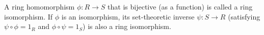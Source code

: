A ring homomorphism $\phi: R \to S$ that is bijective (as a function) is called a ring isomorphism. If $\phi$ is an isomorphism, its set-theoretic inverse $\psi: S \to R$ (satisfying $\psi \circ \phi = 1_R$ and $\phi \circ \psi = 1_S$) is also a ring isomorphism.
